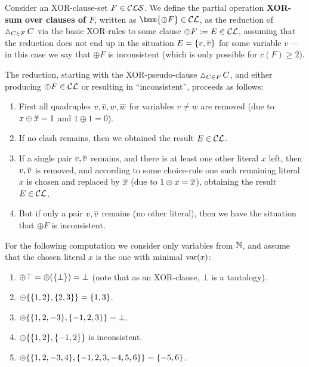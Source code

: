 \documentclass[12pt]{book}
\begin{document}
\begin{defi}\label{def:xorsum}
  \cite{h8} Consider an XOR-clause-set $F \in \mathcal{CLS}$. We define the partial operation \textbf{XOR-sum over clauses of $F$}, written 
  as $\bmm{\oplus F} \in \Cl$, as the reduction of $\operatorname{\vartriangle}_{C \in F} C$ via the basic XOR-rules to some clause $\oplus F := E \in \mathcal{CL}$, 
  assuming that the reduction does not end up in the situation $E = \{ v,\overline{v} \}$ for some variable $v$ --- in this case we say that 
  $\oplus F$ is inconsistent (which is only possible for $c(F) \ge 2$).

  The reduction, starting with the XOR-pseudo-clause $\operatorname{\vartriangle}_{C \in F} C$, and either producing $\oplus F \in \mathcal{CL}$ or resulting in 
  ``inconsistent'', proceeds as follows:
  \begin{enumerate}
  \item First all quadruples $v,\overline{v},w,\overline{w}$ for variables $v \ne w$ are removed (due to $x \oplus \overline{x} = 1$ and $1 \oplus 1 = 0$).
  \item If no clash remains, then we obtained the result $E \in \mathcal{CL}$.
  \item If a single pair $v, \overline{v}$ remains, and there is at least one other literal $x$ left, then $v, \overline{v}$ is removed, and 
  according to some choice-rule one such remaining literal $x$ is chosen and replaced by $\overline{x}$ (due to $1 \oplus x = \overline{x}$), 
  obtaining the result $E \in \mathcal{CL}$.
  \item But if only a pair $v, \overline{v}$ remains (no other literal), then we have the situation that $\oplus F$ is inconsistent.
  \end{enumerate}
\end{defi}

\begin{examp}\label{exp:xorcls2}
  \cite{h8} For the following computation we consider only variables from $\mathbb{N}$, and assume that the chosen literal $x$ is the 
  one with minimal $\operatorname{var}(x)$:
  \begin{enumerate}
  \item $\oplus \top = \oplus(\{ \bot \}) = \bot$ (note that as an XOR-clause, $\bot$ is a tautology).
  \item $\oplus \{ \{ 1,2 \},\{ 2,3 \} \} = \{ 1,3 \}$.
  \item $\oplus \{ \{ 1,2,-3 \},\{ -1,2,3 \} \} = \bot$.
  \item $\oplus \{ \{ 1,2 \},\{ -1,2 \} \}$ is inconsistent.
  \item $\oplus \{ \{ 1,2,-3,4 \},\{ -1,2,3,-4,5,6 \} \} = \{ -5,6 \}$.
  \end{enumerate}
\end{examp}
\end{document}
